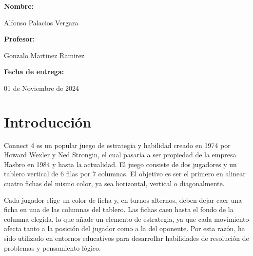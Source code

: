 \documentclass[12pt]{article}
\begin{document}
\begin{titlepage}
		\begin{minipage}[l]{0.4\textwidth}
			\begin{flushleft}
				\linespread{1}
			\end{flushleft}
		\end{minipage}
		\begin{minipage}[l]{0.6\textwidth}
			\begin{flushright}
				\begin{flushleft}
					\large \textbf{\hspace{130pt}Nombre: } 
				\end{flushleft}
				Alfonso Palacios Vergara
				\begin{flushleft}
					\large \textbf{\hspace{130pt}Profesor: }
				\end{flushleft}
				Gonzalo Martinez Ramirez
				\begin{flushleft}
					\large \textbf{\hspace{110pt}Fecha de entrega: }
				\end{flushleft}
				01 de Noviembre de 2024
			\end{flushright}
		\end{minipage}
	\end{titlepage}
	
	\clearpage 
	\setcounter{page}{0}
	\setcounter{page}{1}
	\tableofcontents \thispagestyle{myheadings}
	\clearpage
	\setcounter{page}{0}
	\setcounter{page}{1}
	
    \section{Introducción}
    
    Connect 4 es un popular juego de estrategia y habilidad creado en 1974 por Howard Wexler y Ned Strongin, el cual pasaría a ser propiedad de la empresa Hasbro en 1984 y hasta la actualidad. El juego consiste de dos jugadores y un tablero vertical de 6 filas por 7 columnas. El objetivo es ser el primero en alinear cuatro fichas del mismo color, ya sea horizontal, vertical o diagonalmente.
    
    Cada jugador elige un color de ficha y, en turnos alternos, deben dejar caer una ficha en una de las columnas del tablero. Las fichas caen hasta el fondo de la columna elegida, lo que añade un elemento de estrategia, ya que cada movimiento afecta tanto a la posición del jugador como a la del oponente. Por esta razón, ha sido utilizado en entornos educativos para desarrollar habilidades de resolución de problemas y pensamiento lógico.
    
\end{document}
